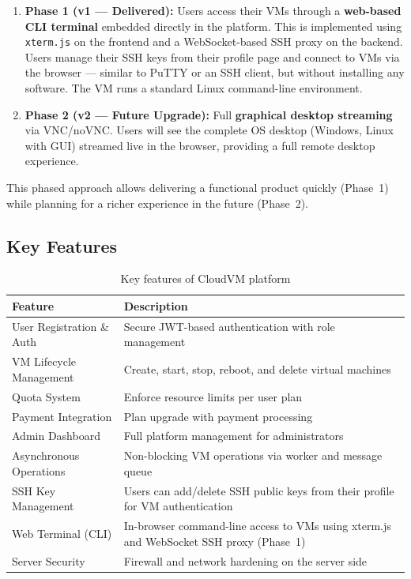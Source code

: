 \begin{enumerate}
  \item \textbf{Phase 1 (v1 --- Delivered):} Users access their VMs through a \textbf{web-based CLI terminal} embedded directly in the platform. This is implemented using \texttt{xterm.js} on the frontend and a WebSocket-based SSH proxy on the backend. Users manage their SSH keys from their profile page and connect to VMs via the browser --- similar to PuTTY or an SSH client, but without installing any software. The VM runs a standard Linux command-line environment.
  \item \textbf{Phase 2 (v2 --- Future Upgrade):} Full \textbf{graphical desktop streaming} via VNC/noVNC. Users will see the complete OS desktop (Windows, Linux with GUI) streamed live in the browser, providing a full remote desktop experience.
\end{enumerate}

This phased approach allows delivering a functional product quickly (Phase~1) while planning for a richer experience in the future (Phase~2).
\subsection{Key Features}

\begin{table}[H]
\centering
\caption{Key features of CloudVM platform}
\label{tab:features}
\begin{tabularx}{\textwidth}{|l|X|}
\hline
\rowcolor{blue!15}
\textbf{Feature} & \textbf{Description} \\
\hline
User Registration \& Auth & Secure JWT-based authentication with role management \\
\hline
VM Lifecycle Management & Create, start, stop, reboot, and delete virtual machines \\
\hline
Quota System & Enforce resource limits per user plan \\
\hline
Payment Integration & Plan upgrade with payment processing \\
\hline
Admin Dashboard & Full platform management for administrators \\
\hline
Asynchronous Operations & Non-blocking VM operations via worker and message queue \\
\hline
SSH Key Management & Users can add/delete SSH public keys from their profile for VM authentication \\
\hline
Web Terminal (CLI) & In-browser command-line access to VMs using xterm.js and WebSocket SSH proxy (Phase~1) \\
\hline
Server Security & Firewall and network hardening on the server side \\
\hline
\end{tabularx}
\end{table}

